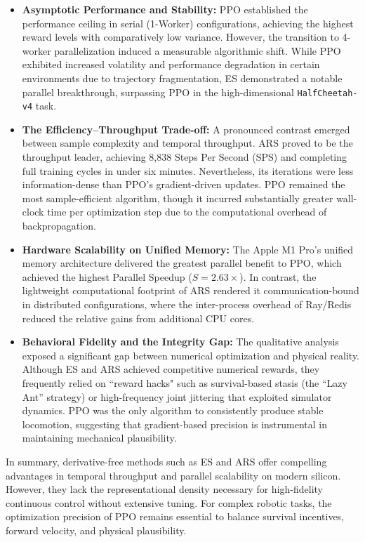 \begin{itemize}
    \item \textbf{Asymptotic Performance and Stability:} PPO established the performance ceiling in serial (1-Worker) configurations, achieving the highest reward levels with comparatively low variance. However, the transition to 4-worker parallelization induced a measurable algorithmic shift. While PPO exhibited increased volatility and performance degradation in certain environments due to trajectory fragmentation, ES demonstrated a notable parallel breakthrough, surpassing PPO in the high-dimensional \texttt{HalfCheetah-v4} task.
    
    \item \textbf{The Efficiency--Throughput Trade-off:} A pronounced contrast emerged between sample complexity and temporal throughput. ARS proved to be the throughput leader, achieving 8,838 Steps Per Second (SPS) and completing full training cycles in under six minutes. Nevertheless, its iterations were less information-dense than PPO's gradient-driven updates. PPO remained the most sample-efficient algorithm, though it incurred substantially greater wall-clock time per optimization step due to the computational overhead of backpropagation.
    
    \item \textbf{Hardware Scalability on Unified Memory:} The Apple M1 Pro's unified memory architecture delivered the greatest parallel benefit to PPO, which achieved the highest Parallel Speedup ($S = 2.63\times$). In contrast, the lightweight computational footprint of ARS rendered it communication-bound in distributed configurations, where the inter-process overhead of Ray/Redis reduced the relative gains from additional CPU cores.
    
    \item \textbf{Behavioral Fidelity and the Integrity Gap:} The qualitative analysis exposed a significant gap between numerical optimization and physical reality. Although ES and ARS achieved competitive numerical rewards, they frequently relied on ``reward hacks" such as survival-based stasis (the ``Lazy Ant'' strategy) or high-frequency joint jittering that exploited simulator dynamics. PPO was the only algorithm to consistently produce stable locomotion, suggesting that gradient-based precision is instrumental in maintaining mechanical plausibility.
\end{itemize}

\medskip

\noindent In summary, derivative-free methods such as ES and ARS offer compelling advantages in temporal throughput and parallel scalability on modern silicon. However, they lack the representational density necessary for high-fidelity continuous control without extensive tuning. For complex robotic tasks, the optimization precision of PPO remains essential to balance survival incentives, forward velocity, and physical plausibility.

\clearpage
\null 
\clearpage